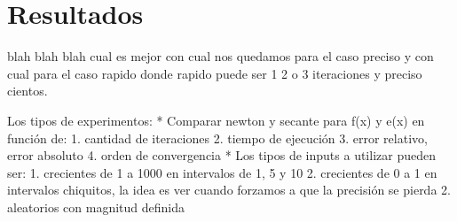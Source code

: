 \section{Resultados}

blah blah blah cual es mejor con cual nos quedamos para el caso preciso y con
cual para el caso rapido donde rapido puede ser 1 2 o 3 iteraciones y preciso
cientos.





Los tipos de experimentos:
* Comparar newton y secante para f(x) y e(x) en función de:
    1. cantidad de iteraciones
    2. tiempo de ejecución
    3. error relativo, error absoluto
    4. orden de convergencia
* Los tipos de inputs a utilizar pueden ser:
    1. crecientes de 1 a 1000 en intervalos de 1, 5 y 10
    2. crecientes de 0 a 1 en intervalos chiquitos, la idea es ver cuando forzamos a que la precisión se pierda
    2. aleatorios con magnitud definida